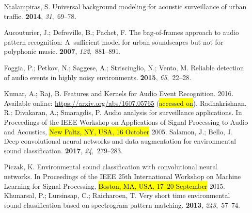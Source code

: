 \documentclass[sensors,article,accept,moreauthors,pdftex,10pt,a4paper]{mdpi}
\begin{document}
\begin{thebibliography}{999}
Ntalampiras, S.
\newblock Universal background modeling for acoustic surveillance of urban
  traffic.
 {\bf 2014}, {\em 31},~69--78.

Aucouturier, J.; Defreville, B.; Pachet, F.
\newblock The bag-of-frames approach to audio pattern recognition: A~sufficient
  model for urban soundscapes but not for polyphonic music.
 {\bf 2007}, {\em 122},~881--891.

Foggia, P.; Petkov, N.; Saggese, A.; Strisciuglio, N.; Vento, M.
\newblock Reliable detection of audio events in highly noisy environments.
 {\bf 2015}, {\em 65},~22--28.

Kumar, A.; Raj, B.
\newblock Features and Kernels for Audio Event Recognition. 2016. 
\newblock Available online: \mbox{\url{https://arxiv.org/abs/1607.05765}} (\hl{accessed on}). 
Radhakrishnan, R.; Divakaran, A.; Smaragdis, P.
\newblock Audio analysis for surveillance applications.
\newblock  In Proceedings of the IEEE Workshop on Applications of Signal Processing to Audio and
  Acoustics, \hl{New Paltz, NY, USA, 16 October} 2005.
Salamon, J.; Bello, J.
\newblock Deep convolutional neural networks and data augmentation for
  environmental sound classification.
 {\bf 2017}, {\em 24},~279--283.

Piczak, K.
\newblock Environmental sound classification with convolutional neural
  networks.
\newblock  In Proceedings of the IEEE 25th International Workshop on Machine Learning for Signal
  Processing, \hl{Boston, MA, USA, 17--20 September }2015.
Khunarsal, P.; Lursinsap, C.; Raicharoen, T.
\newblock Very short time environmental sound classification based on
  spectrogram pattern matching.
 {\bf 2013}, {\em 243},~57--74.


\end{thebibliography}
\end{document}
